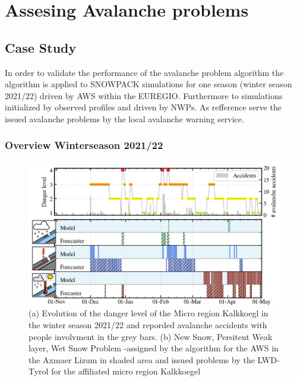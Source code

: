 \chapter{Assesing Avalanche problems }

\section{Case Study}

In order to validate the performance of the avalanche problem algorithm the algorithm is applied to 
SNOWPACK simulations for one season (winter season 2021/22) driven by AWS within the EUREGIO. Furthermore 
to simulations initialized by observed profiles and driven by NWPs. As refference serve the issued avalanche problems by the local
avalanche warning service. 

\subsection{Overview Winterseason 2021/22}


\begin{figure}[h]
    \centering
    \includegraphics[width=\textwidth]{Figures/figures_avapro/AXLIZ_all.png}
    \caption{(a) Evolution of the danger level of the Micro region Kalkkoegl in the winter season 2021/22 and 
    reporded avalanche accidents with people involvment in the grey bars. (b) New Snow, Persitent Weak layer, Wet Snow Problem 
    -assigned by the algorithm for the AWS in the Axmaer Lizum in shaded area and issued problems by the LWD-Tyrol
    for the affiliated micro region Kalkkoegel}
    \label{fig:AXLIZ_dl_avaprobs}
\end{figure}


